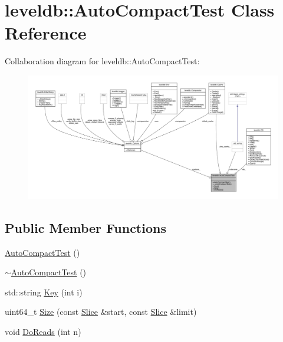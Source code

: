 \hypertarget{classleveldb_1_1_auto_compact_test}{}\section{leveldb\+::Auto\+Compact\+Test Class Reference}
\label{classleveldb_1_1_auto_compact_test}


Collaboration diagram for leveldb\+::Auto\+Compact\+Test\+:
\nopagebreak
\begin{figure}[H]
\begin{center}
\leavevmode
\includegraphics[width=350pt]{classleveldb_1_1_auto_compact_test__coll__graph}
\end{center}
\end{figure}
\subsection*{Public Member Functions}
\begin{DoxyCompactItemize}
\item 
\mbox{\hyperlink{classleveldb_1_1_auto_compact_test_a31fe0ded855f188fac1650c70849760c}{Auto\+Compact\+Test}} ()
\item 
\mbox{\hyperlink{classleveldb_1_1_auto_compact_test_a671873887bb99ee3731add4298a8df0b}{$\sim$\+Auto\+Compact\+Test}} ()
\item 
std\+::string \mbox{\hyperlink{classleveldb_1_1_auto_compact_test_a02993bed0b92d580bb0a51b92191eba9}{Key}} (int i)
\item 
uint64\+\_\+t \mbox{\hyperlink{classleveldb_1_1_auto_compact_test_a4be489ee1b3868f61d9976935e9b2bc4}{Size}} (const \mbox{\hyperlink{classleveldb_1_1_slice}{Slice}} \&start, const \mbox{\hyperlink{classleveldb_1_1_slice}{Slice}} \&limit)
\item 
void \mbox{\hyperlink{classleveldb_1_1_auto_compact_test_a1d1feea1aef1257e461c35eb5b51fa52}{Do\+Reads}} (int n)
\end{DoxyCompactItemize}
